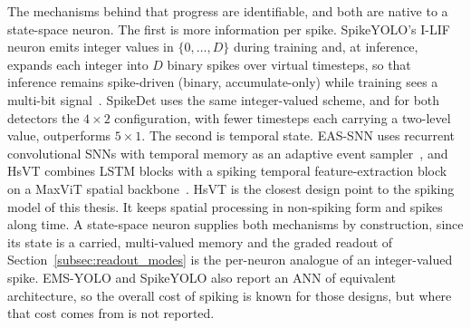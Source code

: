 \documentclass[11pt, a4paper]{report}
\begin{document}
The mechanisms behind that progress are identifiable, and both are native to a state-space neuron. The first is more information per spike. SpikeYOLO's I-LIF neuron emits integer values in $\{0,\dots,D\}$ during
training and, at inference, expands each integer into $D$ binary spikes over virtual timesteps, so that
inference remains spike-driven (binary, accumulate-only) while training sees a multi-bit
signal~\cite{luo2024integer}. SpikeDet uses the same integer-valued scheme, and for both detectors the
$4\times2$ configuration, with fewer timesteps each carrying a two-level value, outperforms $5\times1$. The second is temporal state. EAS-SNN uses recurrent convolutional SNNs with temporal memory as an adaptive event sampler~\cite{wang2024eas},
and HsVT combines LSTM blocks with a spiking temporal feature-extraction block on a MaxViT spatial
backbone~\cite{xu2025hybrid}. HsVT is the closest design point to the spiking model of this thesis. It keeps
spatial processing in non-spiking form and spikes along time. A state-space neuron supplies both mechanisms
by construction, since its state is a carried, multi-valued memory and the graded readout of
Section~\ref{subsec:readout_modes} is the per-neuron analogue of an integer-valued spike. EMS-YOLO and
SpikeYOLO also report an ANN of equivalent architecture, so the overall cost of spiking is known for those designs, but where that cost comes from is not reported.
\end{document}
